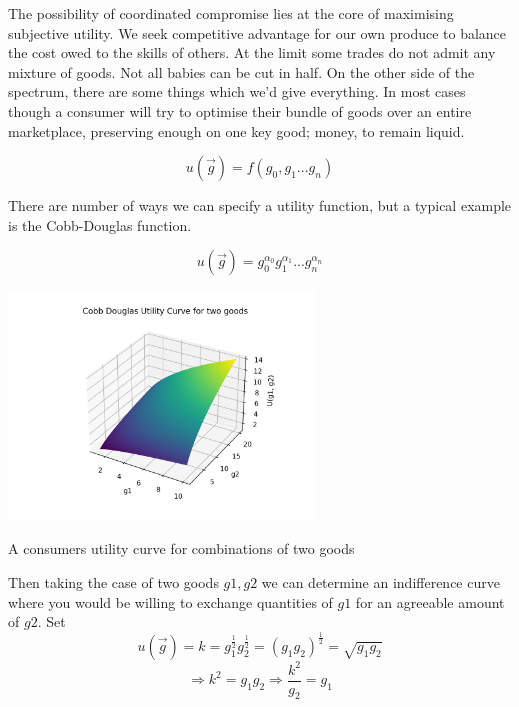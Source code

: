 \documentclass{tufte-handout}
\begin{document}
The possibility of coordinated compromise lies at the core of maximising subjective utility. We seek competitive advantage for our own produce to balance the cost owed to the skills of others. At the limit some trades do not admit any mixture of goods. Not all babies can be cut in half. On the other side of the spectrum, there are some things which we'd give everything. In most cases though a consumer will try to optimise their bundle of goods over an entire marketplace, preserving enough on one key good; money, to remain liquid. 

$$ u(\overrightarrow{g}) = f(g_{0}, g_{1} ... g_{n}) $$

There are number of ways we can specify a utility function, but a typical example is the Cobb-Douglas function. 

$$ u(\overrightarrow{g}) = g_{0}^{\alpha_{0}}g_{1}^{\alpha_{1}} ... g_{n}^{\alpha_{n}}$$

\begin{marginfigure}
\includegraphics[width=3.2in, height=5.in]{Plots/cobb_douglas_utility.png}
\caption{A consumers utility curve for combinations of two goods}
\end{marginfigure} 

Then taking the case of two goods $g1, g2$ we can determine an indifference curve where you would be willing to exchange quantities of $g1$ for an agreeable amount of $g2$.  Set 
$$u(\overrightarrow{g}) = k =  g_{1}^{\frac{1}{2}}g_{2}^{\frac{1}{2}} = (g_{1}g_{2})^{\frac{1}{2}}  = \sqrt{g_{1}g_{2}}$$
$$ \Rightarrow k^{2} = g_{1}g_{2} \Rightarrow \frac{k^{2}}{g_{2}} = g_{1}$$
\end{document}
